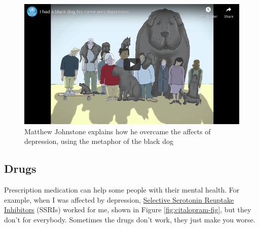 \documentclass[
]{book}
\begin{document}
\begin{figure}

{\centering \includegraphics[width=0.99\linewidth]{images/youtube-blackdog} 

}

\caption{Matthew Johnstone explains how he overcame the affects of depression, using the metaphor of the black dog \citep{youtube-blackdog}}\label{fig:sad-fig}
\end{figure}



\hypertarget{drugs}{%
\subsection{Drugs}\label{drugs}}

Prescription medication can help some people with their mental health. For example, when I was affected by depression, \href{https://www.nhs.uk/conditions/ssri-antidepressants/}{Selective Serotonin Reuptake Inhibitors} (SSRIs) worked for me, shown in Figure \ref{fig:citalopram-fig}, but they don't for everybody. Sometimes the drugs don't work, they just make you worse. \citep{drugsdontwork}
\end{document}
